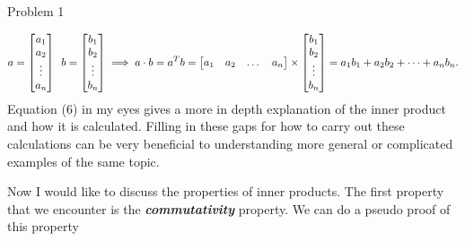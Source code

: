 \begin{problem}{Problem 1}
\begin{Highlight}
        \begin{equation}
            a = 
            \begin{bmatrix}
                a_{1} \\
                a_{2} \\
                \vdots \\
                a_{n} \\
            \end{bmatrix}
            \hspace*{5pt}
            b = 
            \begin{bmatrix}
                b_{1} \\
                b_{2} \\
                \vdots \\
                b_{n} \\
            \end{bmatrix}
            \implies
            a \cdot b =
            a^{T}b = 
            \begin{bmatrix}
                a_{1} & a_{2} & \dots & a_{n} \\
            \end{bmatrix}
            \times
            \begin{bmatrix}
                b_{1} \\
                b_{2} \\
                \vdots \\
                b_{n} \\
            \end{bmatrix}
            = a_{1}b_{1} + a_{2}b_{2} + \dots + a_{n}b_{n}.
        \end{equation}
        Equation (6) in my eyes gives a more in depth explanation of the inner product and how it is calculated. Filling in these gaps for how to carry out these calculations can be very beneficial
        to understanding more general or complicated examples of the same topic.

        Now I would like to discuss the properties of inner products. The first property that we encounter is the \textbf{\textit{commutativity}} property. We can do a pseudo proof of this property


\end{Highlight}
\end{problem}

